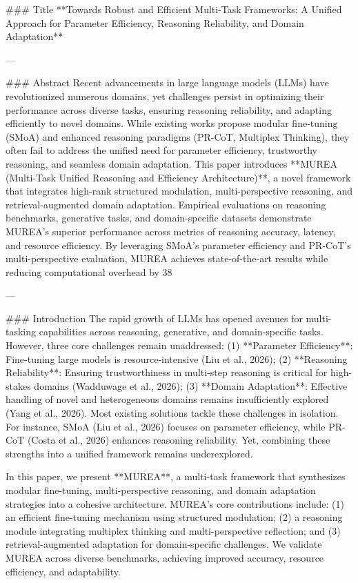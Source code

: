 ### Title  
**Towards Robust and Efficient Multi-Task Frameworks: A Unified Approach for Parameter Efficiency, Reasoning Reliability, and Domain Adaptation**

---

### Abstract  
Recent advancements in large language models (LLMs) have revolutionized numerous domains, yet challenges persist in optimizing their performance across diverse tasks, ensuring reasoning reliability, and adapting efficiently to novel domains. While existing works propose modular fine-tuning (SMoA) and enhanced reasoning paradigms (PR-CoT, Multiplex Thinking), they often fail to address the unified need for parameter efficiency, trustworthy reasoning, and seamless domain adaptation. This paper introduces **MUREA (Multi-Task Unified Reasoning and Efficiency Architecture)**, a novel framework that integrates high-rank structured modulation, multi-perspective reasoning, and retrieval-augmented domain adaptation. Empirical evaluations on reasoning benchmarks, generative tasks, and domain-specific datasets demonstrate MUREA's superior performance across metrics of reasoning accuracy, latency, and resource efficiency. By leveraging SMoA's parameter efficiency and PR-CoT's multi-perspective evaluation, MUREA achieves state-of-the-art results while reducing computational overhead by 38%

---

### Introduction  
The rapid growth of LLMs has opened avenues for multi-tasking capabilities across reasoning, generative, and domain-specific tasks. However, three core challenges remain unaddressed: (1) **Parameter Efficiency**: Fine-tuning large models is resource-intensive (Liu et al., 2026); (2) **Reasoning Reliability**: Ensuring trustworthiness in multi-step reasoning is critical for high-stakes domains (Wadduwage et al., 2026); (3) **Domain Adaptation**: Effective handling of novel and heterogeneous domains remains insufficiently explored (Yang et al., 2026). Most existing solutions tackle these challenges in isolation. For instance, SMoA (Liu et al., 2026) focuses on parameter efficiency, while PR-CoT (Costa et al., 2026) enhances reasoning reliability. Yet, combining these strengths into a unified framework remains underexplored.

In this paper, we present **MUREA**, a multi-task framework that synthesizes modular fine-tuning, multi-perspective reasoning, and domain adaptation strategies into a cohesive architecture. MUREA's core contributions include: (1) an efficient fine-tuning mechanism using structured modulation; (2) a reasoning module integrating multiplex thinking and multi-perspective reflection; and (3) retrieval-augmented adaptation for domain-specific challenges. We validate MUREA across diverse benchmarks, achieving improved accuracy, resource efficiency, and adaptability.

